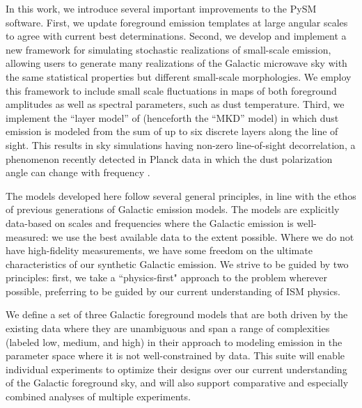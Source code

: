 \documentclass[twocolumn]{aastex631}
\begin{document}
In this work, we introduce several important improvements to the PySM software. First, we update foreground emission templates at large angular scales to agree with current best determinations. Second, we develop and implement a new framework for simulating stochastic realizations of small-scale emission, allowing users to generate many realizations of the Galactic microwave sky with the same statistical properties but different small-scale morphologies. We employ this framework to include small scale fluctuations in maps of both foreground amplitudes as well as spectral parameters, such as dust temperature. Third, we implement the ``layer model'' of \citet{Martinez-Solaeche:2018} (henceforth the ``MKD'' model) in which dust emission is modeled from the sum of up to six discrete layers along the line of sight. This results in sky simulations having non-zero line-of-sight decorrelation, a phenomenon recently detected in Planck data in which the dust polarization angle can change with frequency \citep{Pelgrims:2021}. 

The models developed here follow several general principles, in line with the ethos of previous generations of Galactic emission models. The models are explicitly data-based on scales and frequencies where the Galactic emission is well-measured: we use the best available data to the extent possible. Where we do not have high-fidelity measurements, we have some freedom on the ultimate characteristics of our synthetic Galactic emission. We strive to be guided by two principles: first, we take a ``physics-first" approach to the problem wherever possible, preferring to be guided by our current understanding of ISM physics. 


We define a set of three Galactic foreground models that are both driven by the existing data where they are unambiguous and span a range of complexities (labeled low, medium, and high) in their approach to modeling emission in the parameter space where it is not well-constrained by data. This suite will enable individual experiments to optimize their designs over our current understanding of the Galactic foreground sky, and will also support comparative and especially combined analyses of multiple experiments. 
\end{document}
